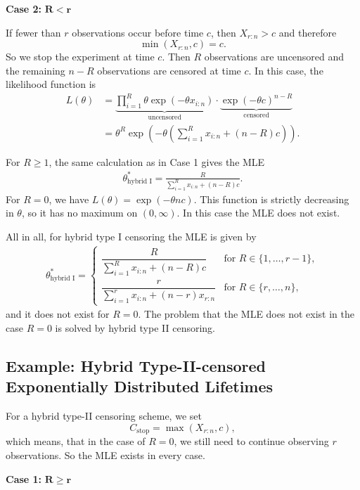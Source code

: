 \textbf{Case 2:} $\mathbf{R < r}$

If fewer than $r$ observations occur before time $c$, then $X_{r:n} > c$ and therefore
\[
\min \left( X_{r:n}, c \right) = c.
\]
So we stop the experiment at time $c$. 
Then $R$ observations are uncensored and the remaining $n - R$ observations are censored at time $c$. 
In this case, the likelihood function is
\begin{align*}
	L(\theta) 
	&=
	\underbrace{ \prod_{i=1}^R \theta \exp \left( - \theta x_{i:n} \right)}_{\text{uncensored}} \cdot \underbrace{\exp(- \theta c)^{n-R}}_{\text{censored}} \\
	&=
	\theta^R \exp \left( - \theta \left( \sum_{i = 1}^R x_{i:n} + (n-R) c \right) \right).
\end{align*}

For $R \geq 1$, the same calculation as in Case 1 gives the MLE
\begin{align*}
	\theta^\ast_{\text{hybrid I}} = \frac{R}{\sum_{i = 1}^R x_{i:n} + (n-R) c}.
\end{align*}
For $R = 0$, we have $L(\theta) = \exp(-\theta n c)$. This function is strictly decreasing in $\theta$, so it has no maximum on $(0, \infty)$. 
In this case the MLE does not exist.

All in all, for hybrid type I censoring the MLE is given by
\begin{align} \label{MLE hybrid I}
	\theta^\ast_{\text{hybrid I}} = 
	\begin{cases}
		\dfrac{R}{\sum_{i = 1}^R x_{i:n} + (n-R) c} & \text{for } R \in \{1, \ldots , r-1\}, \\[3ex]
		\dfrac{r}{\sum_{i = 1}^r x_{i:n} + (n-r) x_{r:n}} & \text{for } R \in \{r, \ldots , n\},
	\end{cases}
\end{align}
and it does not exist for $R = 0$. The problem that the MLE does not exist in the case $R = 0$ is solved by hybrid type II censoring.

\subsection{Example: Hybrid Type-II-censored Exponentially Distributed Lifetimes}

For a hybrid type-II censoring scheme, we set 
\[
C_{\text{stop}} = \max \left( X_{r:n}, c \right),
\]
which means, that in the case of $R = 0$, we still need to continue observing $r$ observations. So the MLE exists in every case. 

\textbf{Case 1:} $\mathbf{R \geq r}$ \\

